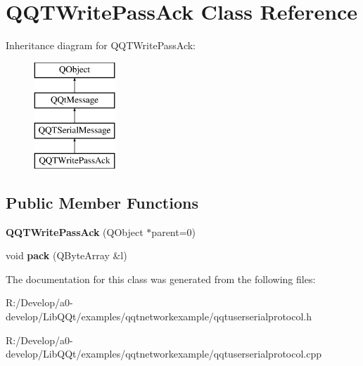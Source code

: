 \hypertarget{class_q_q_t_write_pass_ack}{}\section{Q\+Q\+T\+Write\+Pass\+Ack Class Reference}
\label{class_q_q_t_write_pass_ack}
Inheritance diagram for Q\+Q\+T\+Write\+Pass\+Ack\+:\begin{figure}[H]
\begin{center}
\leavevmode
\includegraphics[height=4.000000cm]{class_q_q_t_write_pass_ack}
\end{center}
\end{figure}
\subsection*{Public Member Functions}
\begin{DoxyCompactItemize}
\item 
\mbox{\label{class_q_q_t_write_pass_ack_aa368182e69a4591c4add0eb3f5a2cc04}} 
{\bfseries Q\+Q\+T\+Write\+Pass\+Ack} (Q\+Object $\ast$parent=0)
\item 
\mbox{\label{class_q_q_t_write_pass_ack_a705f99e4995765be93657f903ed234ae}} 
void {\bfseries pack} (Q\+Byte\+Array \&l)
\end{DoxyCompactItemize}


The documentation for this class was generated from the following files\+:\begin{DoxyCompactItemize}
\item 
R\+:/\+Develop/a0-\/develop/\+Lib\+Q\+Qt/examples/qqtnetworkexample/qqtuserserialprotocol.\+h\item 
R\+:/\+Develop/a0-\/develop/\+Lib\+Q\+Qt/examples/qqtnetworkexample/qqtuserserialprotocol.\+cpp\end{DoxyCompactItemize}
